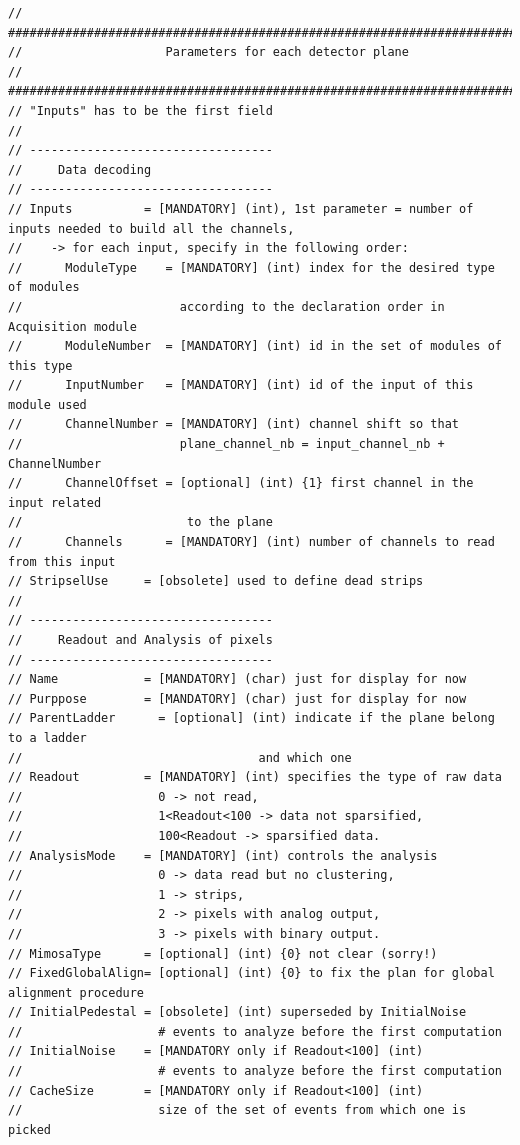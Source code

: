\documentclass[a4paper, 12pt, twoside]{article}
\begin{document}
\begin{verbatim}
// #############################################################################
//                    Parameters for each detector plane
// #############################################################################
// "Inputs" has to be the first field
//
// ----------------------------------
//     Data decoding
// ----------------------------------
// Inputs          = [MANDATORY] (int), 1st parameter = number of inputs needed to build all the channels,
//    -> for each input, specify in the following order:
//      ModuleType    = [MANDATORY] (int) index for the desired type of modules
//                      according to the declaration order in Acquisition module
//      ModuleNumber  = [MANDATORY] (int) id in the set of modules of this type
//      InputNumber   = [MANDATORY] (int) id of the input of this module used
//      ChannelNumber = [MANDATORY] (int) channel shift so that
//                      plane_channel_nb = input_channel_nb + ChannelNumber
//      ChannelOffset = [optional] (int) {1} first channel in the input related
//                       to the plane
//      Channels      = [MANDATORY] (int) number of channels to read from this input
// StripselUse     = [obsolete] used to define dead strips
//
// ----------------------------------
//     Readout and Analysis of pixels
// ----------------------------------
// Name            = [MANDATORY] (char) just for display for now
// Purppose        = [MANDATORY] (char) just for display for now
// ParentLadder      = [optional] (int) indicate if the plane belong to a ladder
//                                 and which one
// Readout         = [MANDATORY] (int) specifies the type of raw data
//                   0 -> not read,
//                   1<Readout<100 -> data not sparsified,
//                   100<Readout -> sparsified data.
// AnalysisMode    = [MANDATORY] (int) controls the analysis
//                   0 -> data read but no clustering,
//                   1 -> strips,
//                   2 -> pixels with analog output,
//                   3 -> pixels with binary output.
// MimosaType      = [optional] (int) {0} not clear (sorry!)
// FixedGlobalAlign= [optional] (int) {0} to fix the plan for global alignment procedure
// InitialPedestal = [obsolete] (int) superseded by InitialNoise
//                   # events to analyze before the first computation
// InitialNoise    = [MANDATORY only if Readout<100] (int)
//                   # events to analyze before the first computation
// CacheSize       = [MANDATORY only if Readout<100] (int)
//                   size of the set of events from which one is picked

\end{verbatim}
\end{document}

